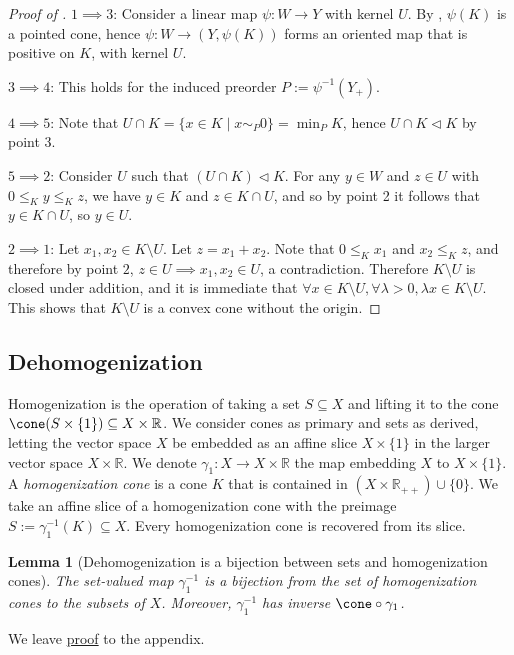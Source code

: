 \documentclass{article}
\theoremstyle{plain}
\newtheorem{lemma}[lemma]{Lemma}
\theoremstyle{definition}
\theoremstyle{remark}
\begin{document}
\begin{proof}[\hypertarget{loc:characterization_of_supporting_subspaces.proof}{}Proof of ]

$1  \implies 3$: Consider a linear map $\psi:W \to Y$ with kernel $U$. By , $\psi(K)$ is a pointed cone, hence $\psi:W \to (Y, \psi(K))$ forms an oriented map that is positive on $K$, with kernel $U$.

$3 \implies 4$: This holds for the induced preorder $P := \psi^{-1}(Y_+)$.

$4 \implies 5$: Note that $U \cap K = \{ x \in K \mid x \sim_{P} 0\} = \min_P K$, hence $U \cap K \triangleleft K$ by  point 3.

$5 \implies 2$: Consider $U$ such that $(U \cap K) \triangleleft K$.
For any $y \in W$ and $z \in U$ with $0 \le_{K} y \le_{K} z$,
we have $y \in K$ and $z \in K \cap U$, and so
by  point 2
it follows that $y \in K \cap U$, so $y \in U$.

$2  \implies 1$: Let $x_1,x_2 \in K \setminus U$. Let $z = x_1 + x_2$.
Note that $0 \le_{K} x_1$ and $x_2 \le_{K} z$, and therefore
by point $2$, $z \in U \implies x_1, x_2 \in U$, a contradiction. 
Therefore $K \setminus U$ is closed under addition, and it is
immediate that $\forall x \in K \setminus U, \forall \lambda >0, \lambda x \in K \setminus U$.
This shows that $K\setminus U$ is a convex cone without the origin.
\end{proof}
\subsection{Dehomogenization}
\label{loc:body.positivity_minimization_and_faces.dehomogenization}
Homogenization is the operation of taking a set $S \subseteq X$ and lifting it to the cone $\cone(S \times \{ 1 \}) \subseteq X  \times \mathbb{R}$.
We consider cones as primary and sets as derived, letting the vector space $X$ be embedded as an affine slice $X  \times \{ 1 \}$ in the larger vector space $X  \times \mathbb{R}$. We denote $\gamma_1: X \to X  \times \mathbb{R}$ the map embedding $X$ to $X  \times \{ 1 \}$. A \emph{homogenization cone} is a cone $K$
that is contained in $(X \times \mathbb{R}_{++}) \cup \{ 0 \}$. We take
an affine slice of a homogenization cone with the preimage 
$S := \gamma_1^{-1}(K) \subseteq X$. Every homogenization cone is recovered from its slice.
\begin{lemma}[Dehomogenization is a bijection between sets and homogenization cones]
\label{loc:dehomogenization_is_a_bijection_between_sets_and_homogenization_cones.statement}
The set-valued map $\gamma_1^{-1}$ is a bijection from the set of homogenization
cones to the subsets of $X$. Moreover, $\gamma_1^{-1}$ has inverse $\cone\circ\gamma_1$.
\end{lemma}
We leave \hyperlink{loc:dehomogenization_is_a_bijection_between_sets_and_homogenization_cones.proof}{proof} to the appendix.
\end{document}
